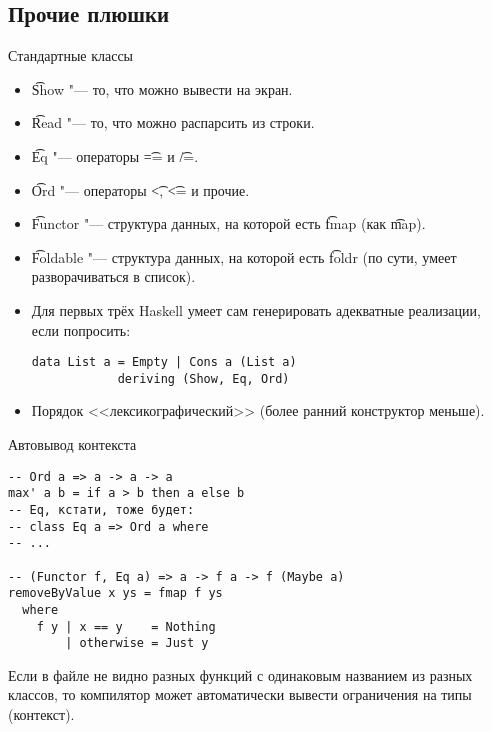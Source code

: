 \subsection{Прочие плюшки}
\begin{frame}[fragile]{Стандартные классы}
	\begin{itemize}
		\item \t{Show} "--- то, что можно вывести на экран.
		\item \t{Read} "--- то, что можно распарсить из строки.
		\item \t{Eq} "--- операторы \t{==} и \t{/=}.
		\item \t{Ord} "--- операторы \t{<}, \t{<=} и прочие.
		\item \t{Functor} "--- структура данных, на которой есть \t{fmap} (как \t{map}).
		\item \t{Foldable} "--- структура данных, на которой есть \t{foldr} (по сути, умеет разворачиваться в список).
		\item Для первых трёх Haskell умеет сам генерировать адекватные реализации, если попросить:
\begin{verbatim}
data List a = Empty | Cons a (List a)
            deriving (Show, Eq, Ord)
\end{verbatim}
		\item Порядок <<лексикографический>> (более ранний конструктор меньше).
	\end{itemize}
\end{frame}

\begin{frame}[fragile]{Автовывод контекста}
\begin{verbatim}
-- Ord a => a -> a -> a
max' a b = if a > b then a else b
-- Eq, кстати, тоже будет:
-- class Eq a => Ord a where
-- ...

-- (Functor f, Eq a) => a -> f a -> f (Maybe a)
removeByValue x ys = fmap f ys
  where
    f y | x == y    = Nothing
        | otherwise = Just y
\end{verbatim}
	Если в файле не видно разных функций с одинаковым названием из разных классов, то компилятор может автоматически вывести ограничения на типы (контекст).
\end{frame}

